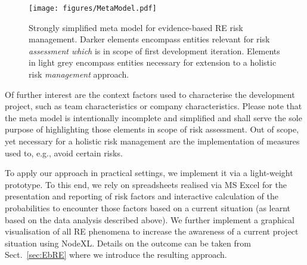 \documentclass[lnbip]{svmultln}
\begin{document}
\begin{figure}[!hbtp]
\centering
  \texttt{[image: figures/MetaModel.pdf]}\\
  \caption{Strongly simplified meta model for evidence-based RE risk management. Darker elements encompass entities relevant for risk \emph{assessment which} is in scope of first development iteration. Elements in light grey encompass entities necessary for extension to a holistic risk \emph{management} approach.}
  \label{fig:MetaModel}
\end{figure} 
Of further interest are the context factors used to characterise the development project, such as team characteristics or company characteristics. Please note that the meta model is intentionally incomplete and simplified and shall serve the sole purpose of highlighting those elements in scope of risk assessment. Out of scope, yet necessary for a holistic risk management are the implementation of measures used to, e.g., avoid certain risks.

To apply our approach in practical settings, we implement it via a light-weight prototype. To this end, we rely on spreadsheets realised via MS Excel for the presentation and reporting of risk factors and interactive calculation of the probabilities to encounter those factors based on a current situation (as learnt based on the data analysis described above). We further implement a graphical visualisation of all RE phenomena to increase the awareness of a current project situation using NodeXL. Details on the outcome can be taken from Sect.~\ref{sec:EbRE} where we introduce the resulting approach. 
\end{document}
